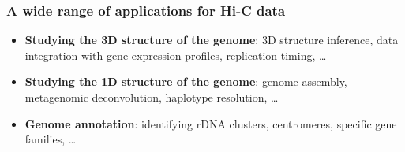 \documentclass[xcolor=dvipsnames]{beamer}
\begin{document}
\begin{frame}
\frametitle{A wide range of applications for Hi-C data}
\begin{overlayarea}{12cm}{6cm}
\begin{itemize}
\item<1-> \textbf{Studying the 3D structure of the genome}: 3D structure
inference, data integration with gene expression profiles, replication timing,
\dots
\item<2-> \textbf{Studying the 1D structure of the genome}: genome assembly,
metagenomic deconvolution, haplotype resolution, \dots
\item<3-> \textbf{Genome annotation}: identifying rDNA clusters, centromeres,
specific gene families, \dots
\end{itemize}
\end{overlayarea}
\begin{overlayarea}{12cm}{3cm}
\end{overlayarea}
\end{frame}
\end{document}
